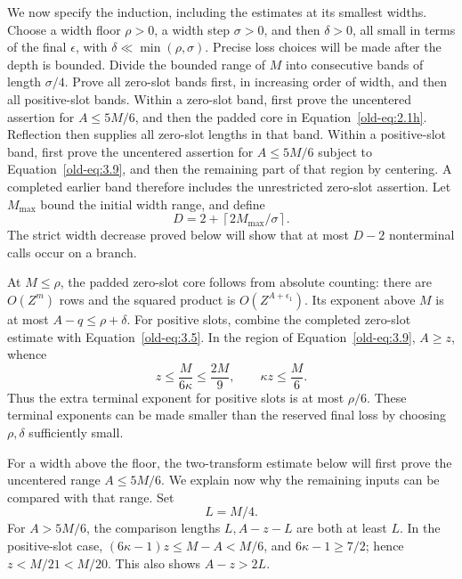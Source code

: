\documentclass[11pt,a4paper]{article}
\numberwithin{equation}{section}
\numberwithin{figure}{section}
\theoremstyle{definition}
\theoremstyle{remark}
\begin{document}
We now specify the induction, including the estimates at its smallest
widths.  Choose a width floor \(\rho>0\), a width step \(\sigma>0\),
and then \(\delta>0\), all small in terms of the final
\(\epsilon\), with \(\delta\ll\min(\rho,\sigma)\).  Precise loss
choices will be made after the depth is bounded.  Divide the bounded
range of \(M\) into consecutive bands of length \(\sigma/4\).
Prove all zero-slot bands first, in increasing order of width, and
then all positive-slot bands.  Within a zero-slot band, first prove
the uncentered assertion for \(A\le5M/6\), and then the padded core
in Equation~\eqref{old-eq:2.1h}.  Reflection then supplies all
zero-slot lengths in that band.  Within a positive-slot band, first
prove the uncentered assertion for \(A\le5M/6\) subject to
Equation~\eqref{old-eq:3.9}, and then the remaining part of that
region by centering.  A completed earlier band therefore includes
the unrestricted zero-slot assertion.  Let \(M_{\max}\) bound the
initial width range, and define
\[
 D=2+\left\lceil 2M_{\max}/\sigma\right\rceil.
\]
The strict width decrease proved below will show that at most \(D-2\)
nonterminal calls occur on a branch.

At \(M\le\rho\), the padded zero-slot core follows from absolute
counting: there are \(O(Z^m)\) rows and the squared product is
\(O(Z^{A+\epsilon_1})\).  Its exponent above \(M\) is at most
\(A-q\le\rho+\delta\).  For positive slots, combine the completed
zero-slot estimate with Equation~\eqref{old-eq:3.5}.  In the region
of Equation~\eqref{old-eq:3.9}, \(A\ge z\), whence
\begin{equation}
 z\le\frac{M}{6\kappa}\le\frac{2M}{9},
 \qquad \kappa z\le\frac M6.
 \label{old-eq:3.6}
\end{equation}
Thus the extra terminal exponent for positive slots is at most
\(\rho/6\).  These terminal exponents can be made smaller than the
reserved final loss by choosing \(\rho,\delta\) sufficiently small.

For a width above the floor, the two-transform estimate below will
first prove the uncentered range \(A\le5M/6\).  We explain now why
the remaining inputs can be compared with that range.  Set
\begin{equation}
 L=M/4.
 \label{old-eq:2.2}
\end{equation}
For \(A>5M/6\), the comparison lengths \(L,A-z-L\) are both at
least \(L\).  In the positive-slot case,
\((6\kappa-1)z\le M-A<M/6\), and \(6\kappa-1\ge7/2\); hence
\(z<M/21<M/20\).  This also shows \(A-z>2L\).
\end{document}
